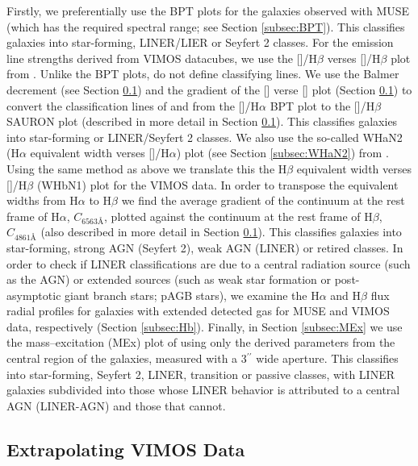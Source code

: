 	Firstly, we preferentially use the BPT plots for the galaxies observed with MUSE (which has the required spectral range; see Section \ref{subsec:BPT}). This classifies galaxies into star-forming, LINER/LIER or Seyfert 2 classes. For the emission line strengths derived from VIMOS datacubes, we use the []/H$\beta$ verses []/H$\beta$ plot from \citet[hereafter the SAURON plot]{Sarzi2010}. Unlike the BPT plots, \citet{Sarzi2010} do not define classifying lines. We use the Balmer decrement (see Section \ref{subsec:Ndec}) and the gradient of the [] verse [] plot (Section \ref{subsec:Ndec}) to convert the classification lines of \citet{Kewley2001} and \citet{Kauffmann2003a} from the []/H$\alpha$ BPT plot to the []/H$\beta$ SAURON plot (described in more detail in Section \ref{subsec:Ndec}). This classifies galaxies into star-forming or LINER/Seyfert 2 classes. We also use the so-called WHaN2 (H$\alpha$ equivalent width verses []/H$\alpha$) plot (see Section \ref{subsec:WHaN2}) from \citet{CidFernandes2011}. Using the same method as above we translate this the H$\beta$ equivalent width verses []/H$\beta$ (WHbN1) plot for the VIMOS data. In order to transpose the equivalent widths from H$\alpha$ to H$\beta$ we find the average gradient of the continuum at the rest frame of H$\alpha$, $C_\text{6563\AA}$, plotted against the continuum at the rest frame of H$\beta$, $C_\text{4861\AA}$ (also described in more detail in Section \ref{subsec:Ndec}). This classifies galaxies into star-forming, strong AGN (Seyfert 2), weak AGN (LINER) or retired classes. In order to check if LINER classifications are due to a central radiation source (such as the AGN) or extended sources (such as weak star formation or post-asymptotic giant branch stars; pAGB stars), we examine the H$\alpha$ and H$\beta$ flux radial profiles for galaxies with extended detected gas for MUSE and VIMOS data, respectively (Section \ref{subsec:Hb}). Finally, in Section \ref{subsec:MEx} we use the mass--excitation (MEx) plot of \cite{Nyland2016} using only the derived parameters from the central region of the galaxies, measured with a 3$^{\prime\prime}$ wide aperture. This classifies into star-forming, Seyfert 2, LINER, transition or passive classes, with LINER galaxies subdivided into those whose LINER behavior is attributed to a central AGN (LINER-AGN) and those that cannot. 


	\subsection{Extrapolating VIMOS Data}
		\label{subsec:Ndec}

